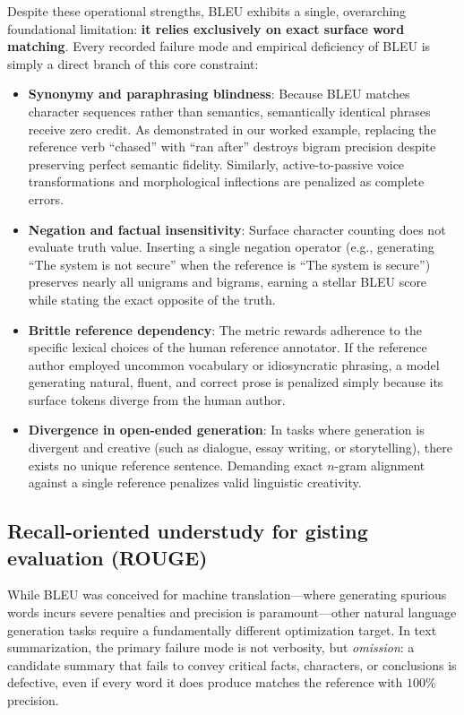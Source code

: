 \documentclass[../../main.tex]{subfiles}
\begin{document}
Despite these operational strengths, BLEU exhibits a single, overarching foundational limitation: \textbf{it relies exclusively on exact surface word matching}. Every recorded failure mode and empirical deficiency of BLEU is simply a direct branch of this core constraint:
\begin{itemize}
    \item \textbf{Synonymy and paraphrasing blindness}: Because BLEU matches character sequences rather than semantics, semantically identical phrases receive zero credit. As demonstrated in our worked example, replacing the reference verb ``chased'' with ``ran after'' destroys bigram precision despite preserving perfect semantic fidelity. Similarly, active-to-passive voice transformations and morphological inflections are penalized as complete errors.
    \item \textbf{Negation and factual insensitivity}: Surface character counting does not evaluate truth value. Inserting a single negation operator (e.g., generating ``The system is not secure'' when the reference is ``The system is secure'') preserves nearly all unigrams and bigrams, earning a stellar BLEU score while stating the exact opposite of the truth.
    \item \textbf{Brittle reference dependency}: The metric rewards adherence to the specific lexical choices of the human reference annotator. If the reference author employed uncommon vocabulary or idiosyncratic phrasing, a model generating natural, fluent, and correct prose is penalized simply because its surface tokens diverge from the human author.
    \item \textbf{Divergence in open-ended generation}: In tasks where generation is divergent and creative (such as dialogue, essay writing, or storytelling), there exists no unique reference sentence. Demanding exact $n$-gram alignment against a single reference penalizes valid linguistic creativity.
\end{itemize}


\subsection{Recall-oriented understudy for gisting evaluation (ROUGE)}
\label{subsec:rouge}

While BLEU was conceived for machine translation---where generating spurious words incurs severe penalties and precision is paramount---other natural language generation tasks require a fundamentally different optimization target. In text summarization, the primary failure mode is not verbosity, but \textit{omission}: a candidate summary that fails to convey critical facts, characters, or conclusions is defective, even if every word it does produce matches the reference with $100\%$ precision.
\end{document}
